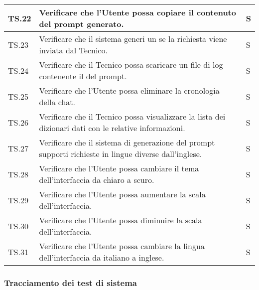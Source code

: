 \begin{adjustwidth}{-0.5cm}{-0.5cm}
\begin{longtable}{|P{1.5cm}|>{\raggedright}P{9.5cm}|>{\arraybackslash}P{1.5cm}|}
		\hline TS.22 & Verificare che l'Utente possa copiare il contenuto del prompt generato. & S \\ 
		\hline TS.23 & Verificare che il sistema generi un  se la richiesta viene inviata dal Tecnico. & S \\ 
		\hline TS.24 & Verificare che il Tecnico possa scaricare un file di log contenente il  del prompt. & S \\
		\hline TS.25 & Verificare che l'Utente possa eliminare la cronologia della chat. & S \\  
		\hline TS.26 & Verificare che il Tecnico possa visualizzare la lista dei dizionari dati con le relative informazioni. & S \\  
		\hline TS.27 & Verificare che il sistema di generazione del prompt supporti richieste in lingue diverse dall'inglese. & S \\  
		\hline TS.28 & Verificare che l'Utente possa cambiare il tema dell'interfaccia da chiaro a scuro. & S \\
		\hline TS.29 & Verificare che l'Utente possa aumentare la scala dell'interfaccia. & S \\  
		\hline TS.30 & Verificare che l'Utente possa diminuire la scala dell'interfaccia. & S \\   
		\hline TS.31 & Verificare che l'Utente possa cambiare la lingua dell'interfaccia da italiano a inglese. & S \\   
	\end{longtable}
\end{adjustwidth}
\egroup

\clearpage
\subsubsection{Tracciamento dei test di sistema}

